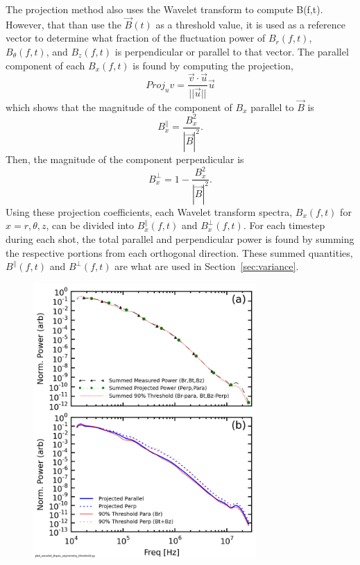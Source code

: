\documentclass[aip,prl,amsmath,amssymb,reprint,superscriptaddress]{revtex4-1} %
\begin{document}
The projection method also uses the Wavelet transform to compute B(f,t). However, that than use the $\vec{B}(t)$ as a threshold value, it is used as a reference vector to determine what fraction of the fluctuation power of $B_{r}(f,t)$, $B_{\theta}(f,t)$, and $B_{z}(f,t)$ is perpendicular or parallel to that vector. The parallel component of each $B_{x}(f,t)$ is found by computing the projection,
\begin{equation}
Proj_{u}v = \frac{\vec{v} \cdot \vec{u}}{||\vec{u}||}\vec{u}
\label{eq:projection}
\end{equation}
which shows that the magnitude of the component of $B_{x}$ parallel to $\vec{B}$ is
\begin{equation}
B_{x}^{\parallel} = \frac{B^{2}_{x}}{|\vec{B}|^{2}}.
\label{eq:para_mag}
\end{equation}
Then, the magnitude of the component perpendicular is
\begin{equation}
B_{x}^{\perp} = 1 - \frac{B^{2}_{x}}{|\vec{B}|^{2}}.
\label{eq:perp_mag}
\end{equation}
Using these projection coefficients, each Wavelet transform spectra, $B_{x}(f,t)$ for $x = r,\theta,z$, can be divided into $B_{x}^{\parallel}(f,t)$ and $B_{x}^{\perp}(f,t)$. For each timestep during each shot, the total parallel and perpendicular power is found by summing the respective portions from each orthogonal direction. These summed quantities, $B^{\parallel}(f,t)$ and $B^{\perp}(f,t)$ are what are used in Section~\ref{sec:variance}.

\begin{figure}[!htbp]
\centerline{
\includegraphics[width=8.5cm]{Bperppara_spectra_thresholdvsprojection40t60us}}
\caption{\label{fig:powercomparison}}
\end{figure}
\end{document}

